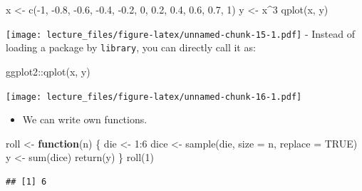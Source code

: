\documentclass[
]{book}
\newenvironment{Shaded}{\begin{snugshade}}{\end{snugshade}}
\newcommand{\AttributeTok}[1]{\textcolor[rgb]{0.77,0.63,0.00}{#1}}
\newcommand{\ConstantTok}[1]{\textcolor[rgb]{0.00,0.00,0.00}{#1}}
\newcommand{\ControlFlowTok}[1]{\textcolor[rgb]{0.13,0.29,0.53}{\textbf{#1}}}
\newcommand{\DecValTok}[1]{\textcolor[rgb]{0.00,0.00,0.81}{#1}}
\newcommand{\FloatTok}[1]{\textcolor[rgb]{0.00,0.00,0.81}{#1}}
\newcommand{\FunctionTok}[1]{\textcolor[rgb]{0.00,0.00,0.00}{#1}}
\newcommand{\NormalTok}[1]{#1}
\newcommand{\OtherTok}[1]{\textcolor[rgb]{0.56,0.35,0.01}{#1}}
\newcommand{\SpecialCharTok}[1]{\textcolor[rgb]{0.00,0.00,0.00}{#1}}
\providecommand{\tightlist}{%
  \setlength{\itemsep}{0pt}\setlength{\parskip}{0pt}}
\begin{document}
\begin{Shaded}
\begin{Highlighting}[]
\NormalTok{x }\OtherTok{\textless{}{-}} \FunctionTok{c}\NormalTok{(}\SpecialCharTok{{-}}\DecValTok{1}\NormalTok{, }\SpecialCharTok{{-}}\FloatTok{0.8}\NormalTok{, }\SpecialCharTok{{-}}\FloatTok{0.6}\NormalTok{, }\SpecialCharTok{{-}}\FloatTok{0.4}\NormalTok{, }\SpecialCharTok{{-}}\FloatTok{0.2}\NormalTok{, }\DecValTok{0}\NormalTok{, }\FloatTok{0.2}\NormalTok{, }\FloatTok{0.4}\NormalTok{, }\FloatTok{0.6}\NormalTok{, }\FloatTok{0.7}\NormalTok{, }\DecValTok{1}\NormalTok{)}
\NormalTok{y }\OtherTok{\textless{}{-}}\NormalTok{ x}\SpecialCharTok{\^{}}\DecValTok{3}
\FunctionTok{qplot}\NormalTok{(x, y)}
\end{Highlighting}
\end{Shaded}

\texttt{[image: lecture\_files/figure-latex/unnamed-chunk-15-1.pdf]}
- Instead of loading a package by \texttt{library}, you can directly call it as:

\begin{Shaded}
\begin{Highlighting}[]
\NormalTok{ggplot2}\SpecialCharTok{::}\FunctionTok{qplot}\NormalTok{(x, y)}
\end{Highlighting}
\end{Shaded}

\texttt{[image: lecture\_files/figure-latex/unnamed-chunk-16-1.pdf]}

\begin{itemize}
\tightlist
\item
  We can write own functions.
\end{itemize}

\begin{Shaded}
\begin{Highlighting}[]
\NormalTok{roll }\OtherTok{\textless{}{-}} \ControlFlowTok{function}\NormalTok{(n) \{}
\NormalTok{  die }\OtherTok{\textless{}{-}} \DecValTok{1}\SpecialCharTok{:}\DecValTok{6}
\NormalTok{  dice }\OtherTok{\textless{}{-}} \FunctionTok{sample}\NormalTok{(die, }\AttributeTok{size =}\NormalTok{ n, }\AttributeTok{replace =} \ConstantTok{TRUE}\NormalTok{)}
\NormalTok{  y }\OtherTok{\textless{}{-}} \FunctionTok{sum}\NormalTok{(dice)}
  \FunctionTok{return}\NormalTok{(y)}
\NormalTok{\}}
\FunctionTok{roll}\NormalTok{(}\DecValTok{1}\NormalTok{)}
\end{Highlighting}
\end{Shaded}

\begin{verbatim}
## [1] 6
\end{verbatim}
\end{document}
